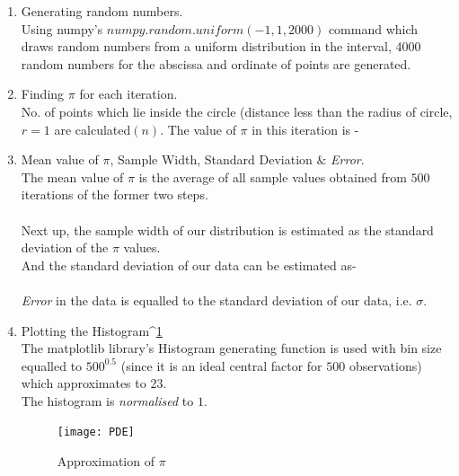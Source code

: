 \documentclass{article}
\begin{document}
\begin{enumerate}
\begin{enumerate}
                \item Generating random numbers.\\ Using numpy's $numpy.random.uniform(-1,1,2000)$ command which draws random numbers from a uniform distribution in the interval, 4000 random numbers for the abscissa and ordinate of points are generated.
                \item Finding $\pi$ for each iteration.\\
                No. of points which lie inside the circle (distance less than the radius of circle, $r=1$ are calculated$(n)$.
                The value of $\pi$ in this iteration is -\\
                \tab \tab \tab {}
                \item Mean value of $\pi$, Sample Width, Standard Deviation $\&$ \emph{Error}.\\
                The mean value of $\pi$ is the average of all sample values obtained from $500$ iterations of the former two steps.\\
                \tab \tab \tab {}\\
                Next up, the sample width of our distribution is estimated as the standard deviation of the $\pi$ values.\\
                And the standard deviation of our data can be estimated as-\\
                \tab \tab \tab {}\\
                \emph{Error} in the data is equalled to the standard deviation of our data, i.e. $\sigma$.
                \item Plotting the Histogram^{\ref{fig:PDF}}\\
                The matplotlib library's Histogram generating function is used with bin size equalled to $500^{0.5}$ (since it is an ideal central factor for $500$ observations) which approximates to 23.\\ The histogram is \emph{normalised} to $1$.\\
                \begin{figure}[!htb]
                \centering
                \texttt{[image: PDE]}
                \caption{\huge {Approximation of $\pi$}}
                \label{fig:PDF}
            \end{figure}
            \end{enumerate}
    \end{enumerate}
    
\end{document}
